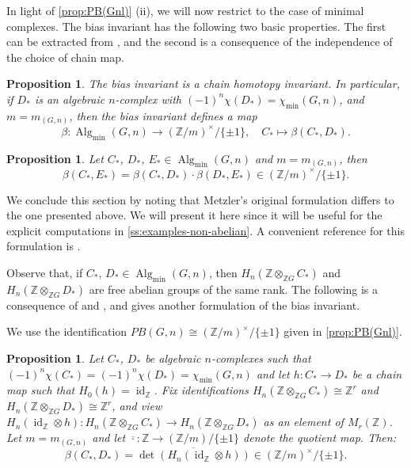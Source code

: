 \documentclass[11pt,a4paper,leqno]{amsart}
\newtheorem{proposition}[theorem]{Proposition}
\theoremstyle{definition}
\theoremstyle{remark}
\newcommand{\Z}{\mathbb{Z}}
\newcommand{\ol}{\overline}
\DeclareMathOperator{\id}{id}
\DeclareMathOperator{\Alg}{Alg}
\begin{document}
In light of \cref{prop:PB(Gnl)} (ii), we will now restrict to the case of minimal complexes.
The bias invariant has the following two basic properties. The first can be extracted from \cite[Theorem 1.13]{Latiolais:1993}, and the second is a consequence of the independence of the choice of chain map.

\begin{proposition} \label{prop:bias-an-invariant}
The bias invariant is a chain homotopy invariant. In particular, if $D_*$ is an algebraic $n$-complex with $(-1)^n\chi(D_*)=\chi_{\min}(G,n)$, and $m = m_{(G,n)}$, then the bias invariant defines a map
\[ \beta\colon \Alg_{\min}(G,n) \to (\Z/m)^\times/\{\pm 1\}, \quad C_* \mapsto \beta(C_*,D_*). \]
\end{proposition}

\begin{proposition} \label{lemma:bias-composition}
Let $C_*$, $D_*$, $E_* \in \Alg_{\min}(G,n)$ and $m = m_{(G,n)}$, then 
\[ \beta(C_*,E_*) = \beta(C_*,D_*) \cdot \beta(D_*,E_*) \in (\Z/m)^\times/\{\pm 1\}. \]
\end{proposition}

We conclude this section by noting that Metzler's original formulation differs to the one presented above. We will present it here since it will be useful for the explicit computations in \cref{ss:examples-non-abelian}. A convenient reference for this formulation is \cite{Latiolais:1993}.

Observe that, if $C_*$, $D_* \in \Alg_{\min}(G,n)$, then $H_n(\Z \otimes_{\Z G} C_*)$ and $H_n(\Z \otimes_{\Z G} D_*)$ are free abelian groups of the same rank. The following is a consequence of \cite[Lemma 1.8 \& Exercise 1.10]{Latiolais:1993} and \cite[p163]{Schafer:1996}, and gives another formulation of the bias invariant.

We use the identification $PB(G,n) \cong (\Z/m)^\times/\{\pm 1\}$ given in \cref{prop:PB(Gnl)}.

\begin{proposition} \label{prop:bias-versions}
Let $C_*$, $D_*$ be algebraic $n$-complexes such that $(-1)^n\chi(C_*) = (-1)^n\chi(D_*)=\chi_{\min}(G,n)$ and let $h\colon C_* \to D_*$ be a chain map such that $H_0(h) = \id_{\Z}$. Fix identifications $H_n(\Z \otimes_{\Z G} C_*) \cong \Z^r$ and $H_n(\Z \otimes_{\Z G} D_*) \cong \Z^r$, and view $H_n(\id_{\Z} \otimes h)\colon H_n(\Z \otimes_{\Z G} C_*) \to H_n(\Z \otimes_{\Z G} D_*)$ as an element of $M_r(\Z)$. Let $m = m_{(G,n)}$ and let $\ol{\cdot}\colon \Z \to (\Z/m)/\{\pm 1\}$ denote the quotient map. Then:
\[ \beta(C_*,D_*) = \ol{\det(H_n(\id_{\Z} \otimes h))} \in (\Z/m)^\times/\{\pm 1\}. \]
\end{proposition}
\end{document}
